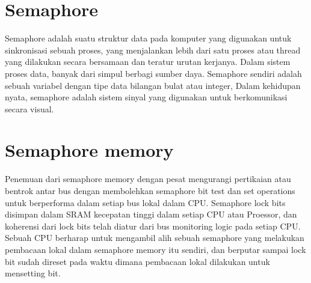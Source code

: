 \section{Semaphore}
Semaphore adalah suatu struktur data pada komputer yang digunakan untuk sinkronisasi sebuah proses, yang menjalankan lebih dari satu proses atau thread yang dilakukan secara bersamaan dan teratur urutan kerjanya. Dalam sistem proses data, banyak dari simpul berbagi sumber daya. 
Semaphore sendiri adalah sebuah variabel dengan tipe data bilangan bulat atau integer, Dalam kehidupan nyata, semaphore adalah sistem sinyal yang digunakan untuk berkomunikasi secara visual.

\section{Semaphore memory}
\cite{earnshaw1991semaphore}Penemuan dari semaphore memory dengan pesat mengurangi pertikaian atau bentrok antar bus dengan membolehkan semaphore bit test dan set operations untuk berperforma dalam setiap bus lokal dalam CPU. Semaphore lock bits disimpan dalam SRAM kecepatan tinggi dalam setiap CPU atau Proessor, dan koherensi dari 
lock bits telah diatur dari bus monitoring logic pada setiap CPU. Sebuah CPU berharap untuk mengambil alih sebuah semaphore yang melakukan pembacaan lokal dalam semaphore memory itu sendiri, dan berputar sampai lock bit sudah direset pada waktu dimana pembacaan lokal dilakukan untuk mensetting bit.
